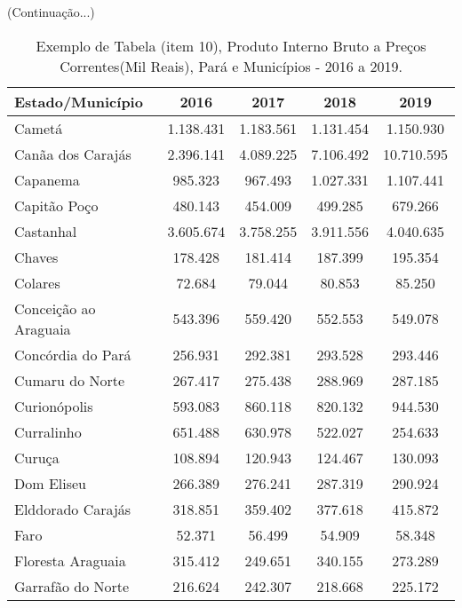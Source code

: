 \newpage
\begin{table}[!htb]
    \centering
    {
    \caption{Exemplo de Tabela (item 10), Produto Interno Bruto a Preços Correntes(Mil Reais), Pará e Municípios - 2016 a 2019.}  (Continuação...)
    \label{item 10 regras2}
    \vspace{0.1cm}
\begin{tabular}{l|c|c|c|c}
  \hline\hline
  Estado/Município        &    2016    &    2017   &    2018   &  2019       \\
  \hline\hline
   Cametá                 &  1.138.431 & 1.183.561 & 1.131.454 & 1.150.930    \\
   Canãa dos Carajás      &  2.396.141 & 4.089.225 & 7.106.492 & 10.710.595   \\
   Capanema               &  985.323   & 967.493   & 1.027.331 & 1.107.441    \\
   Capitão Poço           &  480.143   & 454.009   & 499.285   & 679.266      \\ 
   Castanhal              &  3.605.674 & 3.758.255 & 3.911.556 & 4.040.635    \\
   Chaves                 &  178.428   & 181.414   & 187.399   & 195.354      \\
   Colares                &  72.684    & 79.044    & 80.853    &  85.250     \\
   Conceição ao Araguaia  &  543.396   & 559.420   & 552.553   &  549.078    \\
   Concórdia do Pará      &  256.931   & 292.381   & 293.528   &  293.446    \\
   Cumaru do Norte        &  267.417   & 275.438   & 288.969   &  287.185    \\
   Curionópolis           & 593.083    & 860.118   & 820.132   &  944.530    \\
   Curralinho             & 651.488    &  630.978  &  522.027  &  254.633    \\
   Curuça                 & 108.894    &  120.943  &  124.467  & 130.093     \\
   Dom Eliseu             & 266.389    &  276.241  & 287.319   & 290.924     \\
   Elddorado Carajás      & 318.851    &  359.402  &  377.618  & 415.872     \\
   Faro                   & 52.371     &  56.499   & 54.909    & 58.348      \\
   Floresta  Araguaia     & 315.412    &  249.651  & 340.155   &  273.289   \\
   Garrafão do Norte      & 216.624    &  242.307  &  218.668  &  225.172  \\

\end{tabular}}
\end{table}

